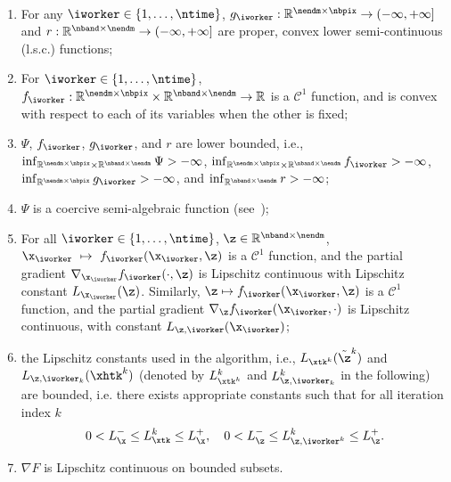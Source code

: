\documentclass[journal,final,letterpaper,twoside,twocolumn]{IEEEtran}
\begin{document}
\begin{assumption} \label{assumption}~
    \begin{enumerate}[label=(\roman*)]
        \item For any $\iworker \in \{1, \dotsc, \ntime\}$, $g_\iworker : \mathbb{R}^{\nendm \times \nbpix} \rightarrow(-\infty, +\infty]$ and $r : \mathbb{R}^{\nband \times \nendm} \rightarrow(-\infty, +\infty]$ are proper, convex lower semi-continuous (l.s.c.) functions; \label{assumption_convexity}
        \item For $\iworker \in \{1, \dotsc, \ntime\}$, $f_\iworker : \mathbb{R}^{\nendm \times \nbpix} \times \mathbb{R}^{\nband \times \nendm} \rightarrow \mathbb{R}$ is a $\mathcal{C}^1$ function, and is convex with respect to each of its variables when the other is fixed;
        \item $\Psi$, $f_\iworker$, $g_\iworker$, and $r$ are lower bounded, i.e., $\inf_{\mathbb{R}^{\nendm \times \nbpix} \times \mathbb{R}^{\nband \times \nendm}} \Psi > -\infty$, $\inf_{\mathbb{R}^{\nendm \times \nbpix} \times \mathbb{R}^{\nband \times \nendm}} f_\iworker > -\infty$, $\inf_{\mathbb{R}^{\nendm \times \nbpix}} g_\iworker > -\infty$, and $\inf_{\mathbb{R}^{\nband \times \nendm}} r > -\infty$;
        \item $\Psi$ is a coercive semi-algebraic function (see~\cite{Bolte2013}); \label{assumption_coercivity}
        \item For all $\iworker \in \{1, \dotsc, \ntime\}$, $\z \in \mathbb{R}^{\nband \times \nendm}$, $\x_\iworker~\mapsto~f_\iworker(\x_\iworker,\z)$ is a $\mathcal{C}^1$ function, and the partial gradient $\nabla_{\x_\iworker} f_\iworker(\cdot,\z)$ is Lipschitz continuous with Lipschitz constant $L_{\x_\iworker}(\z)$. Similarly, $\z \mapsto f_\iworker(\x_\iworker,\z)$ is a $\mathcal{C}^1$ function, and the partial gradient $\nabla_{\z} f_\iworker(\x_\iworker,\cdot)$ is Lipschitz continuous, with constant $L_{\z,\iworker}(\x_\iworker)$; \label{assumption:partial_grad}
        \item the Lipschitz constants used in the algorithm, i.e., $L_{\xtk^k}(\tilde{\z}^k)$ and $L_{\z,\iworker_k}(\xhtk^k)$ (denoted by $L_{\xtk^k}^k$ and $L_{\z,\iworker_k}^k$ in the following) are bounded, i.e. there exists appropriate constants such that for all iteration index $k$ \label{assumption_lip}
        \begin{equation*}
            0 < L_{\x}^- \leq L_{\xtk}^k \leq L_{\x}^+, \quad 0 < L_{\z}^- \leq L_{\z,\iworker^k}^k \leq L_{\z}^+.
        \end{equation*}
        \item $\nabla F$ is Lipschitz continuous on bounded subsets. \label{assumption_lip_bounded}
    \end{enumerate}
\end{assumption}
\end{document}
